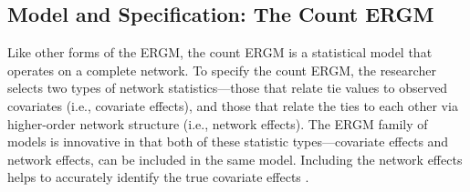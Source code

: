 \documentclass[reqno,onecolumn,letterpaper,12pt]{article}
\begin{document}
\subsection{Model and Specification: The Count ERGM}

Like other forms of the ERGM, the count ERGM is a statistical model that operates on a complete network. To specify the count ERGM, the researcher selects two types of network statistics---those that relate tie values to observed covariates (i.e., covariate effects), and those that relate the ties to each other via higher-order network structure (i.e., network effects). The ERGM family of models is innovative in that both of these statistic types---covariate effects and network effects, can be included in the same model. Including the network effects helps to accurately identify the true covariate effects \citep{metz2018interdependent}. %
\end{document}

